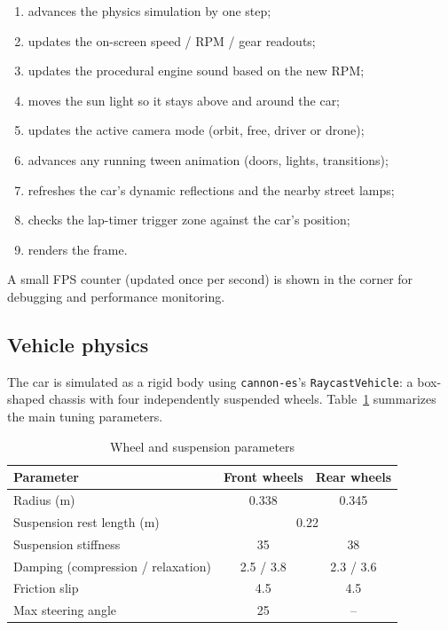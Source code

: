 \documentclass[11pt]{article}
\begin{document}
\begin{enumerate}
    \item advances the physics simulation by one step;
    \item updates the on-screen speed / RPM / gear readouts;
    \item updates the procedural engine sound based on the new RPM;
    \item moves the sun light so it stays above and around the car;
    \item updates the active camera mode (orbit, free, driver or drone);
    \item advances any running tween animation (doors, lights, transitions);
    \item refreshes the car's dynamic reflections and the nearby street
    lamps;
    \item checks the lap-timer trigger zone against the car's position;
    \item renders the frame.
\end{enumerate}

A small FPS counter (updated once per second) is shown in the corner for
debugging and performance monitoring.

\subsection{Vehicle physics}
The car is simulated as a rigid body using \texttt{cannon-es}'s
\texttt{RaycastVehicle}: a box-shaped chassis with four independently
suspended wheels. Table~\ref{tab:wheels} summarizes the main tuning
parameters.

\begin{table}[h]
\centering
\caption{Wheel and suspension parameters}
\label{tab:wheels}
\begin{tabular}{lcc}
\toprule
Parameter & Front wheels & Rear wheels \\
\midrule
Radius (m) & 0.338 & 0.345 \\
Suspension rest length (m) & \multicolumn{2}{c}{0.22} \\
Suspension stiffness & 35 & 38 \\
Damping (compression / relaxation) & 2.5 / 3.8 & 2.3 / 3.6 \\
Friction slip & 4.5 & 4.5 \\
Max steering angle & 25\textdegree{} & -- \\
\bottomrule
\end{tabular}
\end{table}
\end{document}
